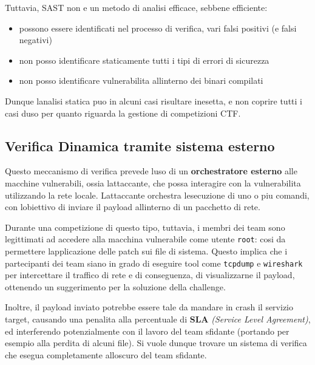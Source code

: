 Tuttavia, SAST non e\textquotesingle{} un metodo di analisi efficace,
sebbene efficiente:

\begin{itemize}
\tightlist
\item
  possono essere identificati nel processo di verifica, vari falsi
  positivi (e falsi negativi)
\item
  non posso identificare staticamente tutti i tipi di errori di
  sicurezza 
\item
  non posso identificare vulnerabilita all\textquotesingle interno dei
  binari compilati
\end{itemize}

Dunque l\textquotesingle analisi statica puo\textquotesingle{} in alcuni
casi risultare inesetta, e non coprire tutti i casi
d\textquotesingle uso per quanto riguarda la gestione di competizioni
CTF.

\subsection{Verifica Dinamica tramite sistema
esterno}\label{verifica-dinamica-tramite-sistema-esterno}

Questo meccanismo di verifica prevede l\textquotesingle uso di un
\textbf{orchestratore esterno} alle macchine vulnerabili, ossia
l\textquotesingle attaccante, che possa interagire con la vulnerabilita
utilizzando la rete locale. L\textquotesingle attaccante orchestra
l\textquotesingle esecuzione di uno o piu comandi, con
l\textquotesingle obiettivo di inviare il payload
all\textquotesingle interno di un pacchetto di rete.

Durante una competizione di questo tipo, tuttavia, i membri dei team
sono legittimati ad accedere alla macchina vulnerabile come utente
\passthrough{\lstinline!root!}: cosi da permettere
l\textquotesingle applicazione delle patch sui file di sistema. Questo
implica che i partecipanti dei team siano in grado di eseguire tool come
\passthrough{\lstinline!tcpdump!} e \passthrough{\lstinline!wireshark!}
per intercettare il traffico di rete e di conseguenza, di visualizzarne
il payload, ottenendo un suggerimento per la soluzione della challenge.

Inoltre, il payload inviato potrebbe essere tale da mandare in crash il
servizio target, causando una penalita alla percentuale di \textbf{SLA}
\emph{(Service Level Agreement)}, ed interferendo potenzialmente con il
lavoro del team sfidante (portando per esempio alla perdita di alcuni
file). Si vuole dunque trovare un sistema di verifica che esegua
completamente all\textquotesingle oscuro del team sfidante.


